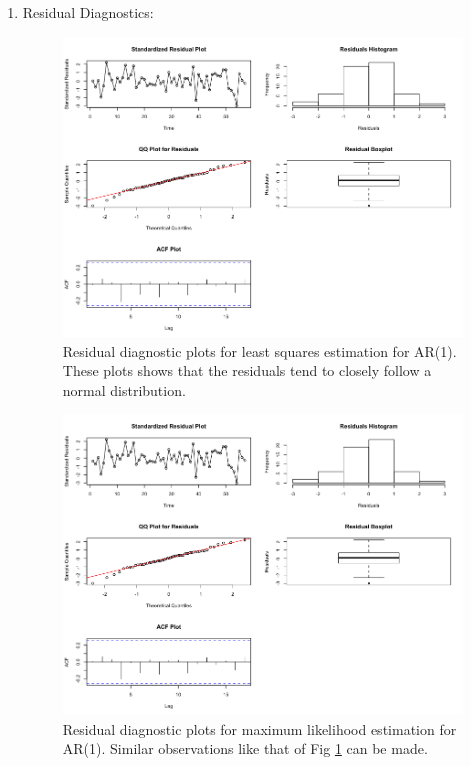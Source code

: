 \begin{enumerate}[label=(\alph*)]
\item Residual Diagnostics:
\begin{figure}[!htb]
    \centering
    \includegraphics[width=\linewidth]{Images/P2/Residual_CSS_AR1.png}
    \caption[Residual diagnostic plots for least squares estimation for AR(1)]{Residual diagnostic plots for least squares estimation for AR(1). These plots shows that the residuals tend to closely follow a normal distribution.}
    \label{fig:residual_css_ar1}
\end{figure}
\begin{figure}[!htb]
    \centering
    \includegraphics[width=\linewidth]{Images/P2/Residual_ML_AR1.png}
    \caption[Residual diagnostic plots for maximum likelihood estimation for AR(1)]{Residual diagnostic plots for maximum likelihood estimation for AR(1). Similar observations like that of Fig \ref{fig:residual_css_ar1} can be made.}

\end{figure}
\end{enumerate}
